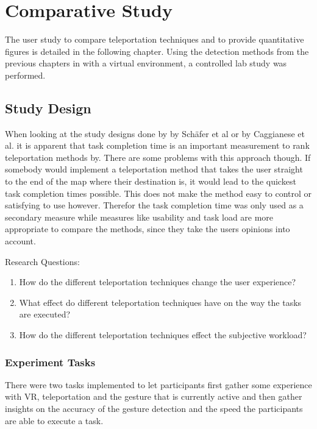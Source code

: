 \chapter{Comparative Study}
The user study to compare teleportation techniques and to provide quantitative figures is detailed in the following chapter. Using the detection methods from the previous chapters in with a virtual environment, a controlled lab study was performed. 




\section{Study Design}
When looking at the study designs done by by Schäfer et al \cite{Schafer2021} or by Caggianese et al. \cite{Caggianese} it is apparent that task completion time is an important measurement to rank teleportation methods by. There are some problems with this approach though. If somebody would implement a teleportation method that takes the user straight to the end of the map where their destination is, it would lead to the quickest task completion times possible. This does not make the method easy to control or satisfying to use however. Therefor the task completion time was only used as a secondary measure while measures like usability and task load are more appropriate to compare the methods, since they take the users opinions into account. 

Research Questions:
\begin{enumerate}
    \item How do the different teleportation techniques change the user experience?
    \item What effect do different teleportation techniques have on the way the tasks are executed?
    \item How do the different teleportation techniques effect the subjective workload?
\end{enumerate}

\subsection{Experiment Tasks}
There were two tasks implemented to let participants first gather some experience with VR, teleportation and the gesture that is currently active and then gather insights on the accuracy of the gesture detection and the speed the participants are able to execute a task.

